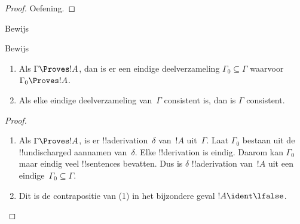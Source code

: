 \documentclass[../../../include/open-logic-section]{subfiles}
\begin{document}
\begin{proof}
Oefening.
\end{proof}

\begin{prob}
Bewijs 
\end{prob}
\tagendprob

\begin{prob}
Bewijs 
\end{prob}
\tagendprob

\begin{prop}[Compactheid]
  \begin{enumerate}
  \item Als $\Gamma \Proves !A$, dan is er een eindige
    deelverzameling $\Gamma_0 \subseteq \Gamma$ waarvoor
    $\Gamma_0 \Proves !A$.
  \item Als elke eindige deelverzameling van~$\Gamma$ consistent is,
    dan is $\Gamma$ consistent.
  \end{enumerate}
\end{prop}

\begin{proof}
  \begin{enumerate}
    \item Als $\Gamma \Proves !A$, is er !!a{derivation}~$\delta$
      van~$!A$ uit~$\Gamma$. Laat $\Gamma_0$ bestaan uit de
      !!{undischarged} aannamen van~$\delta$. Elke !!{derivation} is
      eindig. Daarom kan $\Gamma_0$ maar eindig veel !!{sentence}s
      bevatten. Dus is $\delta$ !!a{derivation} van~$!A$ uit een
      eindige~$\Gamma_0 \subseteq \Gamma$.
    \item Dit is de contrapositie van (1) in het bijzondere geval
      $!A \ident \lfalse$.
  \end{enumerate}
\end{proof}
\end{document}
